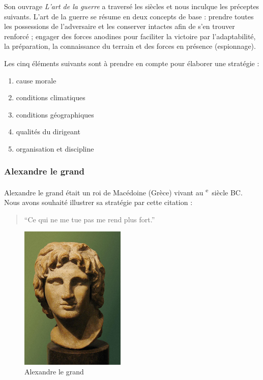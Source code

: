 \documentclass{article}
\newcommand{\cRM}[1]{\MakeUppercase{\romannumeral #1}}  %
\newcommand{\siecle}[1]{\cRM{#1}\textsuperscript{e}~siècle}
\begin{document}
Son ouvrage \emph{L'art de la guerre} \cite{tzu1997art} a traversé les siècles et nous inculque les préceptes suivants. L'art de la guerre se résume en deux concepts de base : prendre toutes les possessions de l'adversaire et les conserver intactes afin de s'en trouver renforcé ; engager des forces anodines pour faciliter la victoire par l'adaptabilité, la préparation, la connaissance du terrain et des forces en présence (espionnage).

Les cinq éléments suivants sont à prendre en compte pour élaborer une stratégie :
\begin{enumerate}
\item cause morale
\item conditions climatiques
\item conditions géographiques
\item qualités du dirigeant
\item organisation et discipline
\end{enumerate}



\subsubsection{Alexandre le grand}
Alexandre le grand était un roi de Macédoine (Grèce) vivant au \siecle{4} BC. Nous avons souhaité illustrer sa stratégie par cette citation : \begin{quote}“Ce qui ne me tue pas me rend plus fort.”\end{quote}
\begin{figure}[H]
	\begin{centering}
	\includegraphics[width=5cm]{../ressources/AlexanderTheGreat_Bust}
	\caption{Alexandre le grand \cite{alexander_the_great}}
	\end{centering}
\end{figure}
\end{document}
